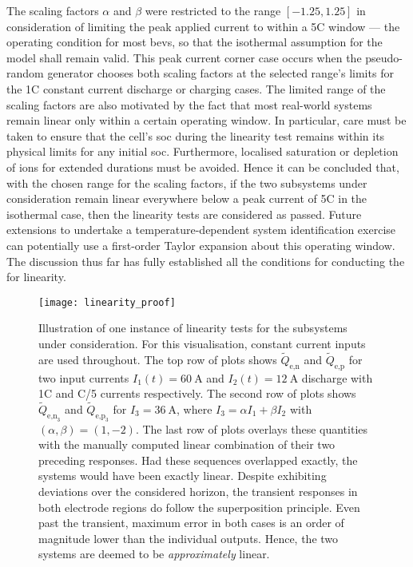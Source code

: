 The  scaling  factors  $\alpha$  and   $\beta$  were  restricted  to  the  range
$[-1.25,1.25]$ in consideration of limiting the peak applied current to within a
\pm 5C  window ---  the operating  condition for most  \glspl{bev}, so  that the
isothermal assumption for the model shall remain valid. This peak current corner
case occurs when the pseudo-random generator chooses both scaling factors at the
selected range's limits for the 1C constant current discharge or charging cases.
The limited  range of the  scaling factors are also  motivated by the  fact that
most real-world systems remain linear only within a certain operating window. In
particular, care  must be taken to  ensure that the cell's  \gls{soc} during the
linearity test  remains within  its physical limits  for any  initial \gls{soc}.
Furthermore, localised  saturation or depletion  of ions for  extended durations
must be avoided. Hence  it can be concluded that, with the  chosen range for the
scaling  factors,  if  the  two subsystems  under  consideration  remain  linear
everywhere below  a peak  current of  \pm 5C  in the  isothermal case,  then the
linearity  tests are  considered as  passed.  Future extensions  to undertake  a
temperature-dependent  system  identification  exercise can  potentially  use  a
first-order Taylor  expansion about this  operating window. The  discussion thus
far has fully established all the conditions for conducting the for linearity.

\begin{figure}[!htbp]
    \centering
    \texttt{[image: linearity\_proof]}
    \caption[Illustration of linearity test for the
     and
     subsystems]{Illustration of one
        instance of linearity tests for the subsystems under consideration. For
        this visualisation, constant current inputs are used throughout. The top
        row of plots shows $\widetilde{Q}_{\text{e,n}}$ and
        $\widetilde{Q}_{\text{e,p}}$ for two input currents $I_1(t) =
        \SI{60}{\ampere}$ and $I_2(t) = \SI{12}{\ampere}$ \ie{} discharge with
        1C and C/5 currents respectively. The second row of plots shows
        $\widetilde{Q}_{\text{e,n}_3}$ and $\widetilde{Q}_{\text{e,p}_3}$  for
        $I_3 = \SI{36}{\ampere}$, where $I_3 = \alpha I_1 + \beta I_2$ with
        $(\alpha,\beta) = (1,-2)$. The last row of plots overlays these
        quantities with the manually computed linear combination of their two
        preceding responses. Had these sequences overlapped exactly, the systems
        would have been exactly linear. Despite exhibiting deviations over the
        considered horizon, the transient responses in both electrode regions do
        follow the superposition principle. Even past the transient, maximum
        error in both cases is an order of magnitude lower than the individual
        outputs. Hence, the two systems are deemed to be \emph{approximately}
        linear.
    }%
    \label{fig:linearity}
\end{figure}


